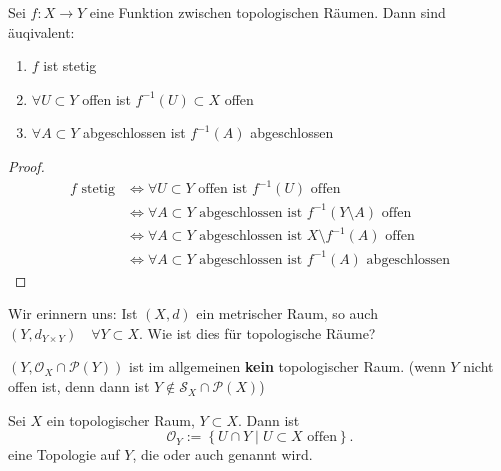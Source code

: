 \begin{theorem}\label{thm:stetig-gdw-urbilder-abgeschlossener-mengen-sind-abgeschlossen}
    Sei $f:X \to  Y$ eine Funktion zwischen topologischen Räumen. Dann sind äuqivalent:
    \begin{enumerate}[1)]
        \item $f$ ist stetig
        \item $\forall U\subset Y$ offen ist $f^{-1}(U) \subset X$ offen
        \item  $\forall A\subset Y$ abgeschlossen ist $f^{-1}(A)$ abgeschlossen
    \end{enumerate}
\end{theorem}
\begin{proof}
    \begin{equation*}
        \begin{split}
            f \text{ stetig} &\iff \forall U \subset  Y \text{ offen ist } f^{-1}(U) \text{ offen}  \\
                             &\iff  \forall A \subset Y \text{ abgeschlossen ist } f^{-1}(Y \setminus A) \text{ offen} \\
                             &\iff \forall A\subset Y \text{ abgeschlossen ist } X \setminus f^{-1}(A) \text{ offen} \\
                             &\iff  \forall A\subset Y \text{ abgeschlossen ist } f^{-1}(A) \text{ abgeschlossen}
        \end{split}
    \end{equation*}
\end{proof}


Wir erinnern uns: Ist $(X,d)$ ein metrischer Raum, so auch  $\left(Y, d_{Y\times Y}\right) \quad \forall Y\subset X$. Wie ist dies für topologische Räume?
\begin{warning}
    $(Y, \mathcal{O}_X \cap \mathcal{P}(Y))$ ist im allgemeinen \textbf{kein} topologischer Raum. (wenn $Y$ nicht offen ist, denn dann ist $Y\not\in \mathcal{S}_X \cap \mathcal{P}(X)$)
\end{warning}
\begin{theoremdef}[Teilraumtopologie]\label{def:teilraumtopologie}
    Sei $X$ ein topologischer Raum,  $Y\subset X$. Dann ist
    \[
    \mathcal{O}_Y := \left \{U \cap Y \mid  U\subset X \text{ offen}\right\} 
    .\] 
    eine Topologie auf $Y$, die   oder auch  genannt wird.  
\end{theoremdef}

